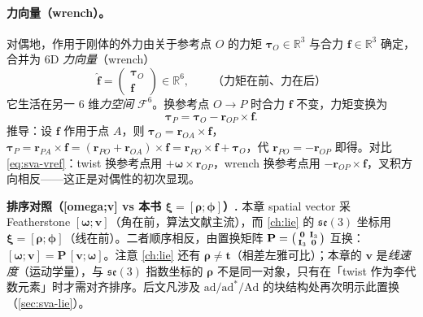\paragraph{力向量（wrench）。}
对偶地，作用于刚体的外力由关于参考点 $O$ 的力矩 $\boldsymbol\tau_O\in\mathbb R^3$ 与合力 $\mathbf f\in\mathbb R^3$ 确定，合并为 6D \emph{力向量}（wrench）
\begin{equation}
  \hat{\mathbf f}=\begin{pmatrix}\boldsymbol\tau_O\\ \mathbf f\end{pmatrix}\in\mathbb R^6,
  \qquad\text{（力矩在前、力在后）}
  \label{eq:sva-wrench}
\end{equation}
它生活在另一 6 维\emph{力空间} $\mathcal F^6$。换参考点 $O\to P$ 时合力 $\mathbf f$ 不变，力矩变换为
\begin{equation}
  \boldsymbol\tau_P=\boldsymbol\tau_O-\mathbf r_{OP}\times\mathbf f.
  \label{eq:sva-tauref}
\end{equation}
推导：设 $\mathbf f$ 作用于点 $A$，则 $\boldsymbol\tau_O=\mathbf r_{OA}\times\mathbf f$，$\boldsymbol\tau_P=\mathbf r_{PA}\times\mathbf f=(\mathbf r_{PO}+\mathbf r_{OA})\times\mathbf f=\mathbf r_{PO}\times\mathbf f+\boldsymbol\tau_O$，代 $\mathbf r_{PO}=-\mathbf r_{OP}$ 即得。对比 \cref{eq:sva-vref}：twist 换参考点用 $+\boldsymbol\omega\times\mathbf r_{OP}$，wrench 换参考点用 $-\mathbf r_{OP}\times\mathbf f$，叉积方向相反——这正是对偶性的初次显现。

\begin{note}
\textbf{排序对照（[omega;v] vs 本书 $\boldsymbol\xi=[\boldsymbol\rho;\boldsymbol\phi]$）.}\;
本章 spatial vector 采 Featherstone $[\boldsymbol\omega;\mathbf v]$（角在前，算法文献主流），而 \cref{ch:lie} 的 $\mathfrak{se}(3)$ 坐标用 $\boldsymbol\xi=[\boldsymbol\rho;\boldsymbol\phi]$（线在前）。二者顺序相反，由置换矩阵
$\mathbf P=\begin{psmallmatrix}\mathbf 0&\mathbf I_3\\ \mathbf I_3&\mathbf 0\end{psmallmatrix}$
互换：$[\boldsymbol\omega;\mathbf v]=\mathbf P\,[\mathbf v;\boldsymbol\omega]$。注意 \cref{ch:lie} 还有 $\boldsymbol\rho\neq\mathbf t$（相差左雅可比）；本章的 $\mathbf v$ 是\emph{线速度}（运动学量），与 $\mathfrak{se}(3)$ 指数坐标的 $\boldsymbol\rho$ 不是同一对象，只有在「twist 作为李代数元素」时才需对齐排序。后文凡涉及 $\mathrm{ad}/\mathrm{ad}^*/\mathrm{Ad}$ 的块结构处再次明示此置换（\cref{sec:sva-lie}）。
\end{note}

